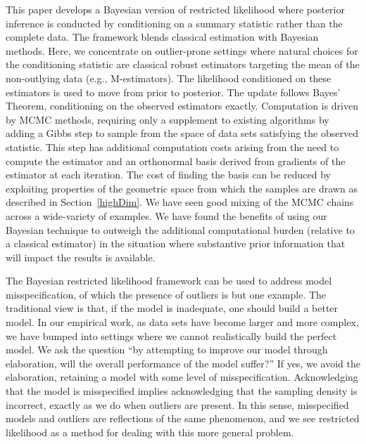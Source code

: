 \documentclass[ba]{imsart}
\newcommand{\response}[1]{{\color{blue}#1}}
\begin{document}
This paper develops a Bayesian version of restricted likelihood where posterior inference is conducted by conditioning on a summary statistic rather than the complete data.  The framework blends classical estimation with Bayesian methods.  
Here, we concentrate on outlier-prone settings where natural choices for the conditioning statistic are classical robust estimators targeting the mean of the non-outlying data (e.g., M-estimators).  The likelihood conditioned on these estimators is used to move from prior to posterior. The update follows Bayes' Theorem, conditioning on the observed estimators exactly.   Computation is driven by MCMC methods, requiring only a supplement to existing algorithms by adding a Gibbs step to sample from the space of data sets satisfying the observed statistic. This step has additional computation costs arising from the need to compute the estimator and an orthonormal basis derived from gradients of the estimator at each iteration. The cost of finding the basis can be reduced by exploiting properties of the geometric space from which the samples are drawn as described in Section~\ref{highDim}. We have seen good mixing of the MCMC chains across a wide-variety of examples. %
\response{We have found the benefits of using our Bayesian technique to outweigh the additional computational burden (relative to a classical estimator) in the situation where substantive prior information that will impact the results is available.}
 
The Bayesian restricted likelihood framework can be used to address model misspecification, of which the presence of outliers is but one example. The traditional view is that, if the model is inadequate, one should build a better model. In our empirical work, as data sets have become larger and more complex, we have bumped into settings where we cannot realistically build the perfect model. We ask the question ``by attempting to improve our model through elaboration, will the overall performance of the model suffer?'' If yes, we avoid the elaboration, retaining a model with some level of misspecification. Acknowledging that the model is misspecified implies acknowledging that the sampling density is incorrect, exactly as we do when outliers are present. In this sense, misspecified models and outliers are reflections of the same phenomenon, and we see restricted likelihood as a method for dealing with this more general problem. 
\end{document}
